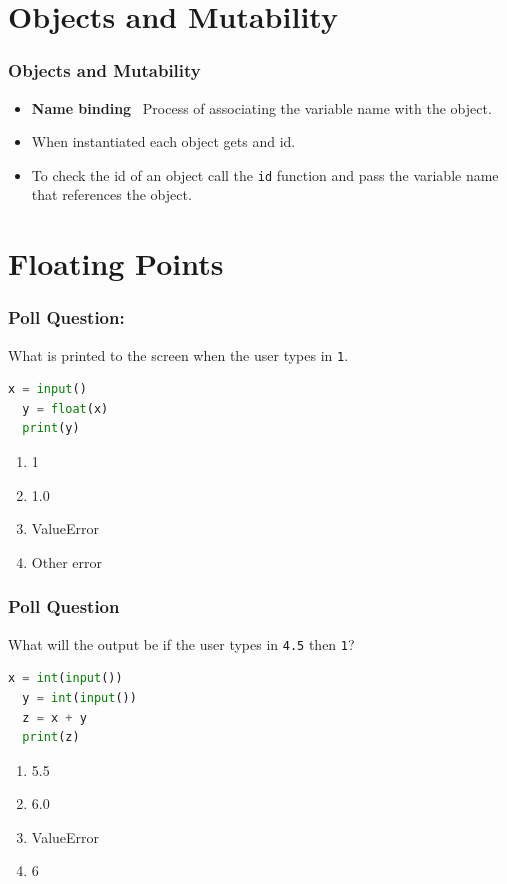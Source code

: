 \documentclass{beamer}
\begin{document}
\section{Objects and Mutability}

%
%
%
\begin{frame}[fragile]
  \frametitle{Objects and Mutability}
  \begin{itemize}
    \item \textbf{Name binding} \textrightarrow \ Process of associating the variable name with the object.
    \item When instantiated each object gets and id.
    \item To check the id of an object call the \lstinline|id| function and pass the variable name that references the object.
  \end{itemize}
\end{frame}


\section{Floating Points}
%
%
%
\begin{frame}[fragile]
  \frametitle{Poll Question: }
  What is printed to the screen when the user types in \lstinline|1|.
  \begin{lstlisting}[language=Python]
  x = input()
  y = float(x)
  print(y)
  \end{lstlisting}
  \vfill
  \begin{enumerate}[A]
    \item 1
    \item 1.0
    \item ValueError
    \item Other error
  \end{enumerate}
\end{frame}


%
%
%
\begin{frame}[fragile]
  \frametitle{Poll Question}
  What will the output be if the user types in \lstinline|4.5| then \lstinline|1|?
  \begin{lstlisting}[language=Python]
  x = int(input())
  y = int(input())
  z = x + y
  print(z)
  \end{lstlisting}
  \vfill
  \begin{enumerate}
    \item 5.5
    \item 6.0
    \item ValueError
    \item 6
  \end{enumerate}
\end{frame}
\end{document}
